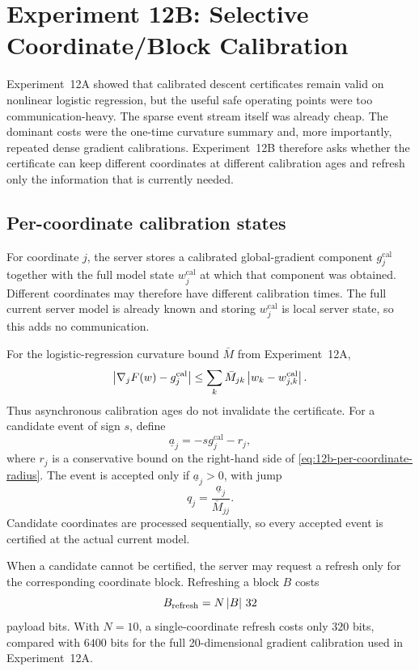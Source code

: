 \section{Experiment 12B: Selective Coordinate/Block Calibration}
\label{sec:exp12b}

Experiment~12A showed that calibrated descent certificates remain valid on nonlinear logistic regression, but the useful safe operating points were too communication-heavy. The sparse event stream itself was already cheap. The dominant costs were the one-time curvature summary and, more importantly, repeated dense gradient calibrations. Experiment~12B therefore asks whether the certificate can keep different coordinates at different calibration ages and refresh only the information that is currently needed.

\subsection{Per-coordinate calibration states}

For coordinate $j$, the server stores a calibrated global-gradient component $g_j^{\mathrm{cal}}$ together with the full model state $w_j^{\mathrm{cal}}$ at which that component was obtained. Different coordinates may therefore have different calibration times. The full current server model is already known and storing $w_j^{\mathrm{cal}}$ is local server state, so this adds no communication.

For the logistic-regression curvature bound $\bar M$ from Experiment~12A,
\begin{equation}
 \left|\nabla_jF(w)-g_j^{\mathrm{cal}}\right|
 \leq
 \sum_k \bar M_{jk}\left|w_k-w_{j,k}^{\mathrm{cal}}\right|.
 \label{eq:12b-per-coordinate-radius}
\end{equation}
Thus asynchronous calibration ages do not invalidate the certificate. For a candidate event of sign $s$, define
\begin{equation}
 \underline a_j
 =
 -s g_j^{\mathrm{cal}}-r_j,
\end{equation}
where $r_j$ is a conservative bound on the right-hand side of \eqref{eq:12b-per-coordinate-radius}. The event is accepted only if $\underline a_j>0$, with jump
\begin{equation}
 q_j=\frac{\underline a_j}{\bar M_{jj}}.
\end{equation}
Candidate coordinates are processed sequentially, so every accepted event is certified at the actual current model.

When a candidate cannot be certified, the server may request a refresh only for the corresponding coordinate block. Refreshing a block $B$ costs
\begin{equation}
 B_{\mathrm{refresh}}=N\left|B\right|\,32
\end{equation}
payload bits. With $N=10$, a single-coordinate refresh costs only $320$ bits, compared with $6400$ bits for the full 20-dimensional gradient calibration used in Experiment~12A.

